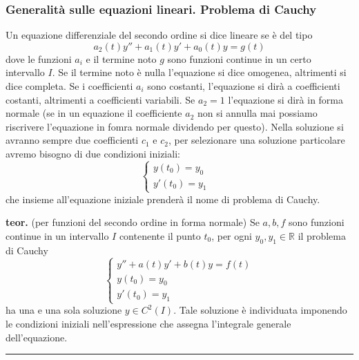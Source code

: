 \subsubsection*{Generalità sulle equazioni lineari. Problema di Cauchy}
Un equazione differenziale del secondo ordine si dice lineare se è del tipo
\[
    a_2(t) y'' + a_1(t) y' +a_0(t) y = g(t)
\]
dove le funzioni $a_i$ e il termine noto $g$ sono funzioni continue in un certo intervallo $I$.\newline
Se il termine noto è nulla l'equazione si dice omogenea, altrimenti si dice completa.\newline
Se i coefficienti $a_i$ sono costanti, l'equazione si dirà a coefficienti costanti, altrimenti a coefficienti variabili.\newline
Se $a_2 = 1$ l'equazione si dirà in forma normale (se in un equazione il coefficiente $a_2$ non si annulla mai possiamo riscrivere l'equazione in fomra normale dividendo per questo).\newline
\newline
Nella soluzione si avranno sempre due coefficienti $c_1$ e $c_2$, per selezionare una soluzione particolare avremo bisogno di due condizioni iniziali:
\[
    \begin{cases}
        y(t_0) = y_0&\\
        y'(t_0) = y_1
    \end{cases}
\]
che insieme all'equazione iniziale prenderà il nome di problema di Cauchy.\newline
\newline
\begin{tcolorbox}
\textbf{teor.} (per funzioni del secondo ordine in forma normale)\newline
Se $a, b, f$ sono funzioni continue in un intervallo $I$ contenente il punto $t_0$, per ogni $y_0, y_1 \in \mathbb{R}$ il problema di Cauchy
\[
    \begin{cases}
        y'' + a(t) y' + b(t) y = f(t)\\
        y(t_0) = y_0\\
        y'(t_0) = y_1
    \end{cases}
\]
ha una e una sola soluzione $y \in C^2(I)$.\newline
Tale soluzione è individuata imponendo le condizioni iniziali nell'espressione che assegna l'integrale generale dell'equazione.\newline
\end{tcolorbox}
\rule{\textwidth}{0,4pt}
